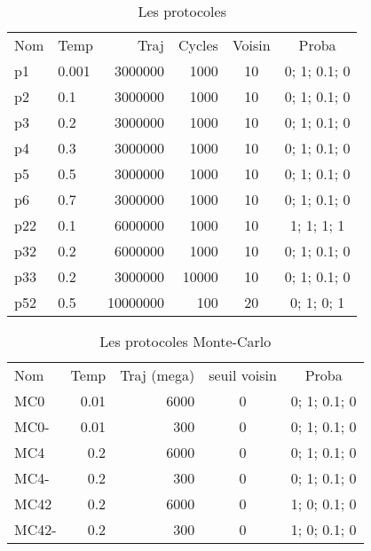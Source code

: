     \begin{table}[!htbp]
      \centering

      \begin{tabular}{llrrcc}

        \toprule
        Nom & Temp & Traj & Cycles  & Voisin & Proba \\
        \cmidrule{1-6}
        p1   & 0.001 &  3000000  &  1000  & 10 & 0; 1; 0.1; 0   \\      
        p2   & 0.1   &  3000000  &  1000  & 10 & 0; 1; 0.1; 0   \\  
        p3   & 0.2   &  3000000  &  1000  & 10 & 0; 1; 0.1; 0   \\ 
        p4   & 0.3   &  3000000  &  1000  & 10 & 0; 1; 0.1; 0   \\               
        p5   & 0.5   &  3000000  &  1000  & 10 & 0; 1; 0.1; 0   \\  
        p6   & 0.7   &  3000000  &  1000  & 10 & 0; 1; 0.1; 0   \\  
        p22  & 0.1   &  6000000  &  1000  & 10 & 1; 1;   1; 1   \\  
        p32  & 0.2   &  6000000  &  1000  & 10 & 0; 1; 0.1; 0   \\      
        p33  & 0.2   &  3000000  & 10000  & 10 & 0; 1; 0.1; 0   \\   
        p52  & 0.5   & 10000000  &   100  & 20 & 0; 1;   0; 1   \\  
        \bottomrule   

        
      \end{tabular}      
      \caption{Les protocoles}
\label{tab_protoMC1}      
    \end{table}



    \begin{table}
      \begin{tabular}{lrrcc}

        \toprule
        Nom & Temp & Traj (mega)& seuil voisin  & Proba \\
        \cmidrule{1-5}
        MC0   & 0.01  &  6000 & 0 & 0; 1; 0.1; 0   \\  
        MC0-  & 0.01  &   300 & 0 & 0; 1; 0.1; 0   \\  
        MC4   & 0.2   &  6000 & 0 & 0; 1; 0.1; 0   \\          
        MC4-  & 0.2   &   300 & 0 & 0; 1; 0.1; 0   \\ 
        MC42  & 0.2   &  6000 & 0 & 1; 0; 0.1; 0   \\        
        MC42- & 0.2   &   300 & 0 & 1; 0; 0.1; 0   \\   
        \bottomrule                   

       
      \end{tabular}      
      \caption{Les protocoles Monte-Carlo}
\label{tab:protoMC2}      

     \end{table}



